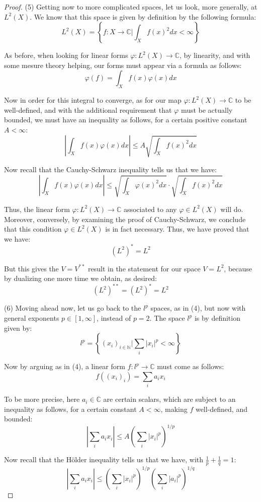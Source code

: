 \documentclass[12pt]{amsbook}
\begin{document}
\begin{proof}
(5) Getting now to more complicated spaces, let us look, more generally, at $L^2(X)$. We know that this space is given by definition by the following formula:
$$L^2(X)=\left\{f:X\to\mathbb C\Big|\int_Xf(x)^2dx<\infty\right\}$$

As before, when looking for linear forms $\varphi:L^2(X)\to\mathbb C$, by linearity, and with some mesure theory helping, our forms must appear via a formula as follows:
$$\varphi(f)=\int_Xf(x)\varphi(x)dx$$

Now in order for this integral to converge, as for our map $\varphi:L^2(X)\to\mathbb C$ to be well-defined, and with the additional requirement that $\varphi$ must be actually bounded, we must have an inequality as follows, for a certain positive constant $A<\infty$:
$$\left|\int_Xf(x)\varphi(x)dx\right|\leq A\sqrt{\int_Xf(x)^2dx}$$

Now recall that the Cauchy-Schwarz inequality tells us that we have:
$$\left|\int_Xf(x)\varphi(x)dx\right|\leq\sqrt{\int_X\varphi(x)^2dx}\cdot\sqrt{\int_Xf(x)^2dx}$$

Thus, the linear form $\varphi:L^2(X)\to\mathbb C$ associated to any $\varphi\in L^2(X)$ will do. Moreover, conversely, by examining the proof of Cauchy-Schwarz, we conclude that this condition $\varphi\in L^2(X)$ is in fact necessary. Thus, we have proved that we have:
$$(L^2)^*=L^2$$

But this gives the $V=V^{**}$ result in the statement for our space $V=L^2$, because by dualizing one more time we obtain, as desired:
$$(L^2)^{**}=(L^2)^*=L^2$$

(6) Moving ahead now, let us go back to the $l^p$ spaces, as in (4), but now with general exponents $p\in[1,\infty]$, instead of $p=2$. The space $l^p$ is by definition given by:
$$l^p=\left\{(x_i)_{i\in\mathbb N}\Big|\sum_i|x_i|^p<\infty\right\}$$

Now by arguing as in (4), a linear form $f:l^p\to\mathbb C$ must come as follows:
$$f\left((x_i)_i\right)=\sum_ia_ix_i$$

To be more precise, here $a_i\in\mathbb C$ are certain scalars, which are subject to an inequality as follows, for a certain constant $A<\infty$, making $f$ well-defined, and bounded:
$$\left|\sum_ia_ix_i\right|\leq A\left(\sum_i|x_i|^p\right)^{1/p}$$

Now recall that the H\"older inequality tells us that we have, with $\frac{1}{p}+\frac{1}{q}=1$:
$$\left|\sum_ia_ix_i\right|\leq\left(\sum_i|x_i|^p\right)^{1/p}\left(\sum_i|a_i|^p\right)^{1/q}$$


\end{proof}
\end{document}

